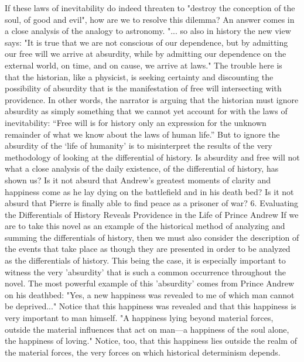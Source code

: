 If these laws of inevitability do indeed threaten to "destroy the conception of the soul, of good and evil", how are we to resolve this dilemma?  An answer comes in a close analysis of the analogy to astronomy.  "... so also in history the new view says: "It is true that we are not conscious of our dependence, but by admitting our free will we arrive at absurdity, while by admitting our dependence on the external world, on time, and on cause, we arrive at laws."  The trouble here is that the historian, like a physicist, is seeking certainty and discounting the possibility of absurdity that is the manifestation of free will intersecting with providence. 
In other words, the narrator is arguing that the historian must ignore absurdity as simply something that we cannot yet account for with the laws of inevitability: “Free will is for history only an expression for the unknown remainder of what we know about the laws of human life.”  But to ignore the absurdity of the ‘life of humanity’ is to misinterpret the results of the very methodology of looking at the differential of history. Is absurdity and free will not what a close analysis of the daily existence, of the differential of history, has shown us?  Is it not absurd that Andrew's greatest moments of clarity and happiness come as he lay dying on the battlefield and in his death bed?  Is it not absurd that Pierre is finally able to find peace as a prisoner of war?  
6. Evaluating the Differentials of History Reveals Providence in the Life of Prince Andrew
If we are to take this novel as an example of the historical method of analyzing and summing the differentials of history, then we must also consider the description of the events that take place as though they are presented in order to be analyzed as the differentials of history. This being the case, it is especially important to witness the very 'absurdity' that is such a common occurrence throughout the novel.  The most powerful example of this 'absurdity' comes from Prince Andrew on his deathbed: "Yes, a new happiness was revealed to me of which man cannot be deprived..." Notice that this happiness was revealed and that this happiness is very important to man himself.  "A happiness lying beyond material forces, outside the material influences that act on man—a happiness of the soul alone, the happiness of loving."  Notice, too, that this happiness lies outside the realm of the material forces, the very forces on which historical determinism depends.

